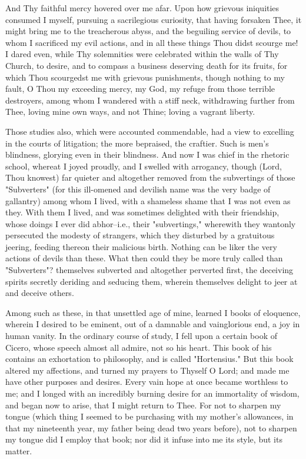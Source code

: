 \documentclass[b5paper,openright,12pt,twoside]{book}
\begin{document}
And Thy faithful mercy hovered over me afar. Upon how grievous
iniquities consumed I myself, pursuing a sacrilegious curiosity, that
having forsaken Thee, it might bring me to the treacherous abyss, and
the beguiling service of devils, to whom I sacrificed my evil actions,
and in all these things Thou didst scourge me! I dared even, while Thy
solemnities were celebrated within the walls of Thy Church, to desire,
and to compass a business deserving death for its fruits, for which Thou
scourgedst me with grievous punishments, though nothing to my fault,
O Thou my exceeding mercy, my God, my refuge from those terrible
destroyers, among whom I wandered with a stiff neck, withdrawing
further from Thee, loving mine own ways, and not Thine; loving a vagrant
liberty.

Those studies also, which were accounted commendable, had a view to
excelling in the courts of litigation; the more bepraised, the craftier.
Such is men's blindness, glorying even in their blindness. And now I
was chief in the rhetoric school, whereat I joyed proudly, and I swelled
with arrogancy, though (Lord, Thou knowest) far quieter and altogether
removed from the subvertings of those "Subverters" (for this ill-omened
and devilish name was the very badge of gallantry) among whom I lived,
with a shameless shame that I was not even as they. With them I lived,
and was sometimes delighted with their friendship, whose doings I ever
did abhor--i.e., their "subvertings," wherewith they wantonly persecuted
the modesty of strangers, which they disturbed by a gratuitous jeering,
feeding thereon their malicious birth. Nothing can be liker the very
actions of devils than these. What then could they be more truly called
than "Subverters"? themselves subverted and altogether perverted first,
the deceiving spirits secretly deriding and seducing them, wherein
themselves delight to jeer at and deceive others.

Among such as these, in that unsettled age of mine, learned I books
of eloquence, wherein I desired to be eminent, out of a damnable and
vainglorious end, a joy in human vanity. In the ordinary course of
study, I fell upon a certain book of Cicero, whose speech almost all
admire, not so his heart. This book of his contains an exhortation
to philosophy, and is called "Hortensius." But this book altered my
affections, and turned my prayers to Thyself O Lord; and made me have
other purposes and desires. Every vain hope at once became worthless to
me; and I longed with an incredibly burning desire for an immortality of
wisdom, and began now to arise, that I might return to Thee. For not
to sharpen my tongue (which thing I seemed to be purchasing with my
mother's allowances, in that my nineteenth year, my father being dead
two years before), not to sharpen my tongue did I employ that book; nor
did it infuse into me its style, but its matter.
\end{document}

